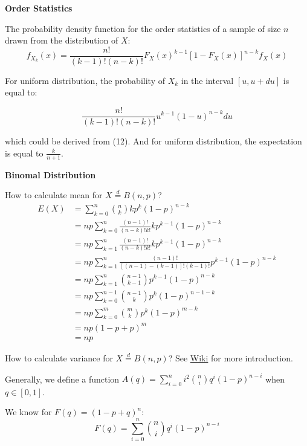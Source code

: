 \documentclass{article}
\begin{document}
\textbf{Order Statistics}

The probability density function for the order statistics of a sample of size \(n\) drawn from the distribution
of \(X\):
\begin{equation}
f_{X_{k}}(x)=\frac{n!}{(k-1)!(n-k)!}F_X(x)^{k-1}[1-F_X(x)]^{n-k}f_X(x)
\end{equation}

For uniform distribution, the probability of \(X_k\) in the interval \([u, u+du]\) is equal to:

\begin{equation}
\frac{n!}{(k-1)!(n-k)!}u^{k-1}(1-u)^{n-k}du
\end{equation}

which could be derived from (12). And for uniform distribution, the expectation is equal
to \(\frac{k}{n+1}\).

\vspace{3mm}
\textbf{Binomal Distribution}

How to calculate mean for \(X\stackrel{d}{=} B(n, p)\)?
\begin{equation*}
\begin{split}
E(X)&=\sum_{k=0}^n{n \choose k} kp^k(1-p)^{n-k}\\
&=np\sum_{k=0}^n\frac{(n-1)!}{(n-k)!k!} kp^{k-1}(1-p)^{n-k}\\
&=np\sum_{k=1}^n\frac{(n-1)!}{(n-k)!k!} kp^{k-1}(1-p)^{n-k}\\
&=np\sum_{k=1}^n\frac{(n-1)!}{[(n-1)-(k-1)]!(k-1)!}p^{k-1}(1-p)^{n-k}\\
&=np\sum_{k=1}^n{n-1 \choose k-1}p^{k-1}(1-p)^{n-k}\\
&=np\sum_{k=0}^{n-1}{n-1 \choose k}p^k(1-p)^{n-1-k}\\
&=np\sum_{k=0}^{m}{m \choose k}p^k(1-p)^{m-k}\\
&=np(1-p+p)^m\\
&=np
\end{split}
\end{equation*}

How to calculate variance for \(X\stackrel{d}{=} B(n, p)\)? See \href{https://en.wikipedia.org/wiki/Binomial_distribution#Variance}{Wiki} for more
introduction.

Generally, we define a function \(A(q)=\sum_{i=0}^ni^2{n \choose i}q^i(1-p)^{n-i}\) when \(q\in [0, 1]\).

We know for \(F(q) = (1-p+q)^n\):
\begin{equation*}
    F(q) = \sum_{i=0}^n {n \choose i}q^i(1-p)^{n-i}
\end{equation*}
\end{document}
